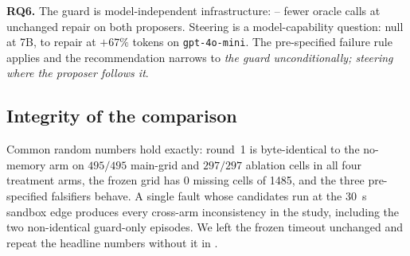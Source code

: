 \textbf{RQ6.} The guard is model-independent infrastructure: --
fewer oracle calls at unchanged repair on both proposers. Steering is a
model-capability question: null at 7B,  to  repair at $+67\%$
tokens on \texttt{gpt-4o-mini}. The pre-specified failure rule applies and the
recommendation narrows to \emph{the guard unconditionally; steering where the
proposer follows it}.

\subsection{Integrity of the comparison}
\label{sec:results-integrity}

Common random numbers hold exactly: round~1 is byte-identical to the no-memory
arm on $495/495$ main-grid and $297/297$ ablation cells in all four treatment
arms, the frozen grid has $0$ missing cells of \num{1485}, and the three
pre-specified falsifiers behave. A single fault whose candidates run at the
\SI{30}{\second} sandbox edge produces every cross-arm inconsistency in the
study, including the two non-identical guard-only episodes. We left the frozen
timeout unchanged and repeat the headline numbers without it in
.

\ifsuppmatter\else\fi
